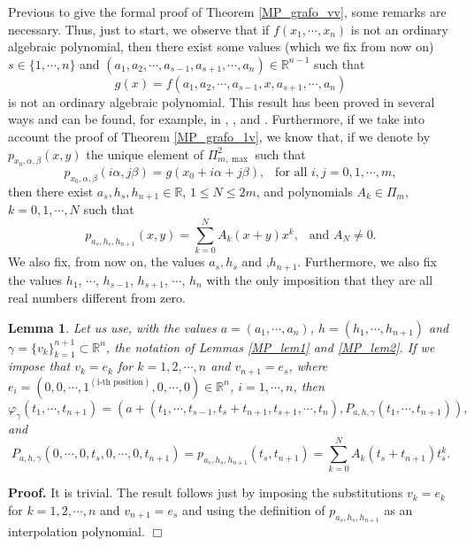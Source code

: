 \documentclass[10pt,a4paper]{amsart}
\newtheorem{lemma}[theorem]{Lemma}
\theoremstyle{definition}
\begin{document}
Previous to give the formal proof of Theorem  \ref{MP_grafo_vv}, some remarks are necessary. Thus, just to start, we observe that if   $f(x_1,\cdots,x_n)$ is not an ordinary algebraic polynomial, then there exist some values (which we fix from now on) $s\in \{1,\cdots,n\}$ and  $(a_1,a_2,\cdots,a_{s-1},a_{s+1},\cdots,a_n)\in\mathbb{R}^{n-1}$ such that 
$$g(x)=f(a_1,a_2,\cdots,a_{s-1},x,a_{s+1},\cdots,a_n)$$ is not an ordinary algebraic polynomial. This result has been proved in several ways and can be found, for example, in   \cite{AK_CJM},  \cite{kuczma}, and  \cite{prager}. Furthermore, if we take into account the proof of Theorem \ref{MP_grafo_1v}, we know that, if we denote by  $p_{x_0,\alpha,\beta}(x,y)$ 
the unique element of $\Pi_{m,\max}^2$ such that 
\[
p_{x_0,\alpha,\beta}(i\alpha,j\beta)=g(x_0+i\alpha+j\beta),\ \ \text{ for all } i,j=0,1,\cdots,m,
\]
then there exist $a_s,h_s,h_{n+1}\in\mathbb{R}$, $1\leq N\leq 2m$, and polynomials $A_k\in \Pi_m$, $k=0,1,\cdots, N$ such that 
\[
p_{a_s,h_s,h_{n+1}}(x,y)=\sum_{k=0}^NA_k(x+y)x^k,\ \ \text{ and } A_N\neq 0.
\]
We also fix, from now on, the values $a_s,h_s$ and ,$h_{n+1}$. Furthermore, we also fix the values $h_1$, $\cdots$, $h_{s-1}$, $h_{s+1}$, $ \cdots$, $h_n$ with the only imposition that they are all real numbers different from zero.

\begin{lemma}\label{MP_lem3} Let us use, with the values $a=(a_1,\cdots,a_n)$, $h=(h_1,\cdots,h_{n+1})$ and $\gamma=\{v_k\}_{k=1}^{n+1}\subset \mathbb{R}^n$, the notation of Lemmas \ref{MP_lem1} and \ref{MP_lem2}. If we impose that $v_k=e_k$ for $k=1,2,\cdots,n$ and  $v_{n+1}=e_s$, where $e_i=(0,0,\cdots,1^{(\text{i-th position})},0,\cdots,0)\in\mathbb{R}^n$, $i=1,\cdots,n$, then
\[
\varphi_{\gamma}(t_1,\cdots,t_{n+1})=(a+(t_1,\cdots,t_{s-1},t_s+t_{n+1},t_{s+1},\cdots,t_n),P_{a,h,\gamma}(t_1,\cdots,t_{n+1})),
\]
and
\[
P_{a,h,\gamma}(0,\cdots,0,t_s,0,\cdots,0,t_{n+1})=p_{a_s,h_s,h_{n+1}}(t_s,t_{n+1})=\sum_{k=0}^NA_k(t_s+t_{n+1})t_s^k.
\]
\end{lemma}

\noindent \textbf{Proof. } It is trivial. The result follows just by imposing the substitutions $v_k=e_k$ for $k=1,2,\cdots,n$ and $v_{n+1}=e_s$ and using the definition of 
 $p_{a_s,h_s,h_{n+1}}$ as an interpolation polynomial. {\hfill $\Box$}
\end{document}
